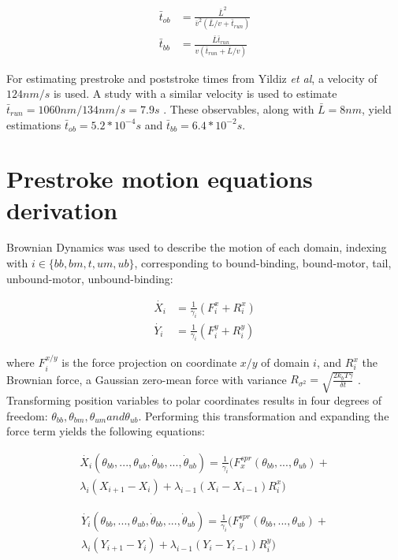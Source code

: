 \documentclass[9pt,twocolumn,twoside]{article}
\begin{document}
  \begin{align}
    \bar{t}_{ob} &= \frac{\bar{L}^2}{\bar{v}^2\left(\bar{L}/v+\bar{t}_{run}\right)}\\
    \bar{t}_{bb} &= \frac{\bar{L}\bar{t}_{run}}{v\left(\bar{t}_{run}+\bar{L}/v\right)}
  \end{align}

  For estimating prestroke and poststroke times from Yildiz \textit{et al}\cite{yildiz}, a velocity of $124 nm/s$ is used. A study with a similar velocity is used to estimate $\bar{t}_{run} = 1060 nm / 134 nm / s = 7.9s$ \cite{weihongpaper}. These observables, along with $\bar{L} = 8nm$, yield estimations $\bar{t}_{ob} = 5.2*10^{-4}s$ and $\bar{t}_{bb} = 6.4 * 10^{-2}s$.

  \section*{Prestroke motion equations derivation}
  Brownian Dynamics was used to describe the motion of each domain, indexing with $i \in \{bb, bm, t, um, ub\}$, corresponding to bound-binding, bound-motor, tail, unbound-motor, unbound-binding:

  \begin{align}
    \dot{X_i} &= \frac{1}{\gamma_i}\left(F^x_i + R^x_i\right)\\
    \dot{Y_i} &= \frac{1}{\gamma_i}\left(F^y_i + R^y_i\right)
  \end{align}

  where $F^{x/y}_i$ is the force projection on coordinate $x/y$ of domain $i$, and $R^x_i$ the Brownian force, a Gaussian zero-mean force with variance $R_{\sigma^2} = \sqrt{\frac{2k_bT\gamma}{\delta t}}$ \cite{einstein}. Transforming position variables to polar coordinates results in four degrees of freedom: $\theta_{bb}, \theta_{bm}, \theta_{um} and \theta_{ub}$. Performing this transformation and expanding the force term yields the following equations:

  \begin{multline}
    \dot{X_i}\left(\theta_{bb}, ..., \theta_{ub}, \dot{\theta}_{bb}, ..., \dot{\theta}_{ub}\right) = \frac{1}{\gamma_i}\big(F^{spr}_x(\theta_{bb}, ..., \theta_{ub}) + \\
    \lambda_i\left(X_{i+1}-X_i\right) + \lambda_{i-1}\left(X_i-X_{i-1}\right)R^x_i\big)
    \label{eq:ob-system}
  \end{multline}

  \begin{multline}
    \dot{Y_i}\left(\theta_{bb}, ..., \theta_{ub}, \dot{\theta}_{bb}, ..., \dot{\theta}_{ub}\right) = \frac{1}{\gamma_i}\big(F^{spr}_y(\theta_{bb}, ..., \theta_{ub}) + \\
    \lambda_i\left(Y_{i+1}-Y_i\right) + \lambda_{i-1}\left(Y_i-Y_{i-1}\right)R^y_i\big)
    \label{eq:ob-system-other}
  \end{multline}
\end{document}
